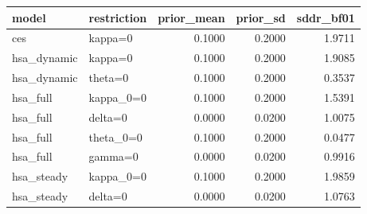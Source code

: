 \begin{tabular}{llrrr}
\toprule
model & restriction & prior\_mean & prior\_sd & sddr\_bf01 \\
\midrule
ces & kappa=0 & 0.1000 & 0.2000 & 1.9711 \\
hsa\_dynamic & kappa=0 & 0.1000 & 0.2000 & 1.9085 \\
hsa\_dynamic & theta=0 & 0.1000 & 0.2000 & 0.3537 \\
hsa\_full & kappa\_0=0 & 0.1000 & 0.2000 & 1.5391 \\
hsa\_full & delta=0 & 0.0000 & 0.0200 & 1.0075 \\
hsa\_full & theta\_0=0 & 0.1000 & 0.2000 & 0.0477 \\
hsa\_full & gamma=0 & 0.0000 & 0.0200 & 0.9916 \\
hsa\_steady & kappa\_0=0 & 0.1000 & 0.2000 & 1.9859 \\
hsa\_steady & delta=0 & 0.0000 & 0.0200 & 1.0763 \\
\bottomrule
\end{tabular}
